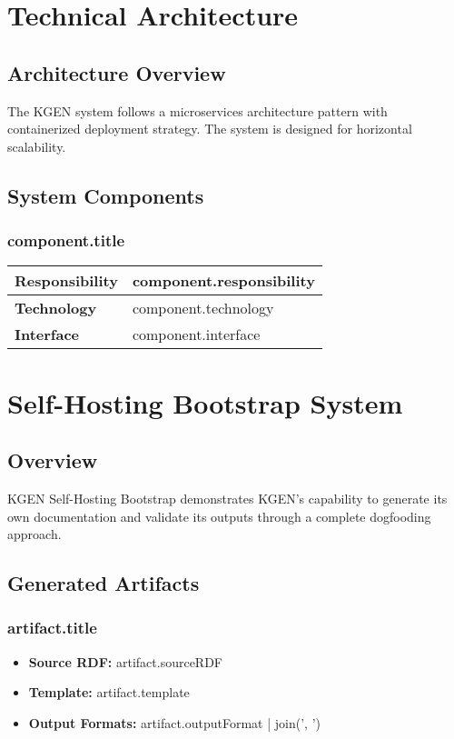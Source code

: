 \documentclass[11pt,a4paper]{article}
\begin{document}
{{%
\section{Technical Architecture}

\subsection{Architecture Overview}
The KGEN system follows a microservices architecture pattern with containerized deployment strategy. The system is designed for horizontal scalability.

\subsection{System Components}
{%
\subsubsection{{{ component.title }}}
\begin{tabular}{|p{3cm}|p{10cm}|}
\hline
\textbf{Responsibility} & {{ component.responsibility }} \\
\hline
\textbf{Technology} & {{ component.technology }} \\
\hline
\textbf{Interface} & {{ component.interface }} \\
\hline
\end{tabular}

{%

\section{Self-Hosting Bootstrap System}

\subsection{Overview}
KGEN Self-Hosting Bootstrap demonstrates KGEN's capability to generate its own documentation and validate its outputs through a complete dogfooding approach.

\subsection{Generated Artifacts}
{%
\subsubsection{{{ artifact.title }}}
\begin{itemize}[leftmargin=2cm]
    \item \textbf{Source RDF:} {{ artifact.sourceRDF }}
    \item \textbf{Template:} {{ artifact.template }}
    \item \textbf{Output Formats:} {{ artifact.outputFormat | join(', ') }}
\end{itemize}
{%

}}}}}}
\end{document}
